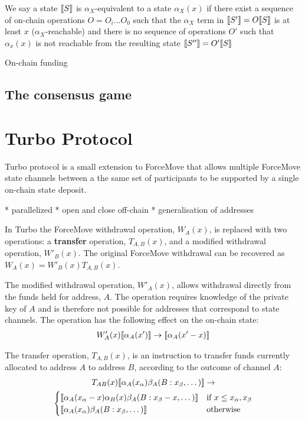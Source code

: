 We say a state $\llbracket S \rrbracket$ is $\alpha_X$-equivalent to a state $\alpha_X(x)$ if there exist
a sequence of on-chain operations $O = O_i \dots O_0$ such that the $\alpha_X$ term in
$\llbracket S' \rrbracket = O\llbracket S \rrbracket$ is at least $x$ ($\alpha_X$-reachable) and there is no sequence of
operations $O'$ such that $\alpha_x(x)$ is not reachable from the resulting state
$\llbracket S'' \rrbracket = O'\llbracket S \rrbracket$ 

On-chain funding

\subsection{The consensus game}


\section{Turbo Protocol}

Turbo protocol is a small extension to ForceMove that allows multiple ForceMove state
channels between a the same set of participants to be supported by a single on-chain
state deposit.

* parallelized
* open and close off-chain
* generalisation of addresses

In Turbo the ForceMove withdrawal operation, $W_A(x)$, is replaced with two operations: a
\textbf{transfer} operation, $T_{A,B}(x)$, and a modified withdrawal operation, $W'_B(x)$.
The original ForceMove withdrawal can be recovered as $W_A(x) = W'_B(x)T_{A,B}(x)$.

The modified withdrawal operation, $W'_A(x)$, allows withdrawal directly from the funds
held for address, $A$. The operation requires knowledge of the private key of $A$ and is
therefore not possible for addresses that correspond to state channels. The operation has
the following effect on the on-chain state:
\begin{align*}
W'_A(x) \llbracket \alpha_A(x') \rrbracket \rightarrow \llbracket \alpha_A(x'-x) \rrbracket
\end{align*}

The transfer operation, $T_{A,B}(x)$, is an instruction to transfer funds currently allocated
to address $A$ to address $B$, according to the outcome of channel $A$:
\begin{multline*}
T_{AB}(x) \llbracket \alpha_A(x_\alpha)\beta_A(B:x_\beta, \dots) \rrbracket \rightarrow \\
  \begin{cases}
      \llbracket \alpha_A(x_\alpha - x)\alpha_B(x)\beta_A(B:x_\beta - x, \dots) \rrbracket & 
      \text{if } x \leq x_\alpha, x_\beta \\
      \llbracket \alpha_A(x_\alpha)\beta_A(B:x_\beta, \dots) \rrbracket &
      \text{otherwise}
  \end{cases}
\end{multline*}



